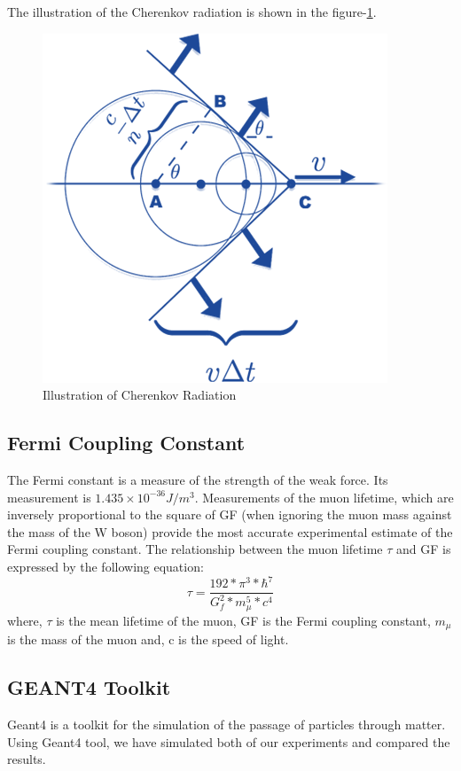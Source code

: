 \documentclass{article}
\begin{document}
\begin{multicols}{2}
The illustration of the Cherenkov radiation is shown in the figure-\ref{cherenkov}.

\begin{figure}[H]
    \centering
    \includegraphics[scale=0.5]{Images/cherenkovcone.png}
    \caption{Illustration of Cherenkov Radiation}
    \label{cherenkov}
\end{figure}



\subsection{Fermi Coupling Constant}

The Fermi constant is a measure of the strength of the weak force.  Its measurement is $1.435 \times 10^{-36}J/m^3$. Measurements of the muon lifetime, which are inversely proportional to the square of GF (when ignoring the muon mass against the mass of the W boson) provide the most accurate experimental estimate of the Fermi coupling constant. The relationship between the muon lifetime $\tau$ and GF is expressed by the following equation:
 \begin{equation}
     \tau=\frac{192*\pi^3*\hbar^7}{G_f^2*m_\mu^5*c^4}
 \end{equation}
where, $\tau$ is the mean lifetime of the muon, GF is the Fermi coupling constant, $m_\mu$ is the mass of the muon and, c is the speed of light.
\subsection{GEANT4 Toolkit}
Geant4 is a toolkit for the simulation of the passage of particles through matter. Using Geant4 tool, we have simulated both of our experiments and compared the results.







\end{multicols}
\end{document}
